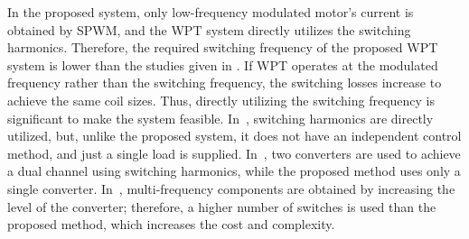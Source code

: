 \documentclass[journal]{IEEEtran}
\begin{document}
In the proposed system, only low-frequency modulated motor's current is obtained by SPWM, and the WPT system directly utilizes the switching harmonics. 
Therefore, the required switching frequency of the proposed WPT system is lower than the studies given in \cite{MFML-hybrid,MFMA-circuit}.
If WPT operates at the modulated frequency rather than the switching frequency, the switching losses increase to achieve the same coil sizes. 
Thus, directly utilizing the switching frequency is significant to make the system feasible. 
In~\cite{multifreq}, switching harmonics are directly utilized, but, unlike the proposed system, it does not have an independent control method, and just a single load is supplied.
In~\cite{single-Tx}, two converters are used to achieve a dual channel using switching harmonics, while the proposed method uses only a single converter.
In~\cite{ML-inverter}, multi-frequency components are obtained by increasing the level of the converter; therefore, a higher number of switches is used than the proposed method, which increases the cost and complexity.
 \vspace*{-2mm}
\end{document}
